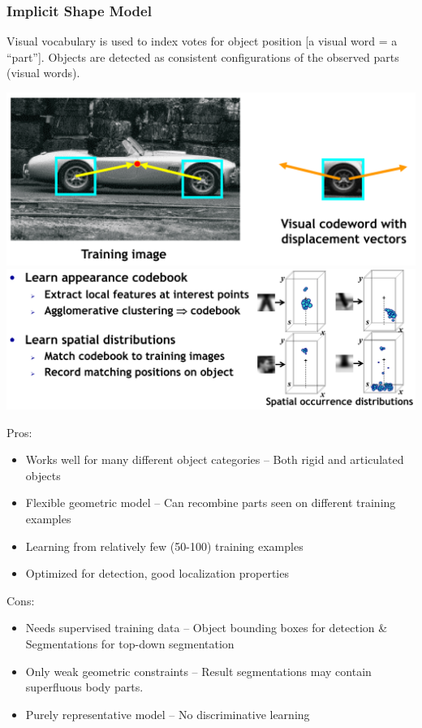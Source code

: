 \subsubsection{Implicit Shape Model}
Visual vocabulary is used to index votes for object position [a visual word = a “part”].
Objects are detected as consistent configurations of the observed parts (visual words).

\includegraphics[width=\columnwidth]{pictures/ISM}
\includegraphics[width=\columnwidth]{pictures/ism_spatial}


Pros:
\begin{itemize}
	\item Works well for many different object categories – Both rigid and articulated objects
	\item Flexible geometric model – Can recombine parts seen on different training examples
	\item Learning from relatively few (50-100) training examples
	\item Optimized for detection, good localization properties
\end{itemize}
Cons:
\begin{itemize}
	\item Needs supervised training data – Object bounding boxes for detection \& Segmentations for top-down segmentation
	\item Only weak geometric constraints – Result segmentations may contain superfluous body parts.
	\item Purely representative model – No discriminative learning
\end{itemize}
